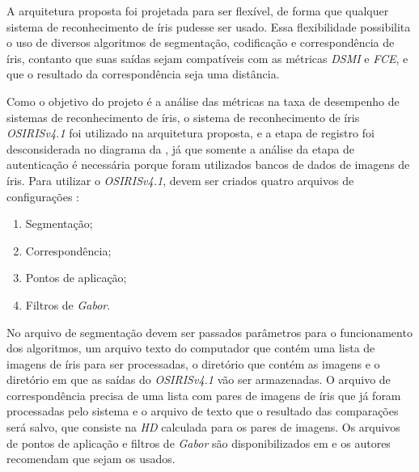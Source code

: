 \par A arquitetura proposta foi projetada para ser flexível, de forma que qualquer sistema de reconhecimento de íris pudesse ser usado. Essa flexibilidade possibilita o uso de diversos algoritmos de segmentação, codificação e correspondência de íris, contanto que suas saídas sejam compatíveis com as métricas \textit{\acrshort{DSMI}} e \textit{\acrshort{FCE}}, e que o resultado da correspondência seja uma distância.

\par Como o objetivo do projeto é a análise das métricas na taxa de desempenho de sistemas de reconhecimento de íris, o sistema de reconhecimento de íris \textit{OSIRISv4.1} \cite{othman2015, osirisv41, osirisv41_doc} foi utilizado na arquitetura proposta, e a etapa de registro foi desconsiderada no diagrama da , já que somente a análise da etapa de autenticação é necessária porque foram utilizados bancos de dados de imagens de íris. Para utilizar o \textit{OSIRISv4.1}, devem ser criados quatro arquivos de configurações \cite{osirisv41_doc}:

\begin{enumerate}
    \item Segmentação;
    \item Correspondência;
    \item Pontos de aplicação;
    \item Filtros de \textit{Gabor}.
\end{enumerate}




\par No arquivo de segmentação devem ser passados parâmetros para o funcionamento dos algoritmos, um arquivo texto do computador que contém uma lista de imagens de íris para ser processadas, o diretório que contém as imagens e o diretório em que as saídas do \textit{OSIRISv4.1} vão ser armazenadas. O arquivo de correspondência precisa de uma lista com pares de imagens de íris que já foram processadas pelo sistema e o arquivo de texto que o resultado das comparações será salvo, que consiste na \textit{\acrshort{HD}} calculada para os pares de imagens. Os arquivos de pontos de aplicação e filtros de \textit{Gabor} são disponibilizados em \cite{osirisv41} e os autores recomendam que sejam os usados.

